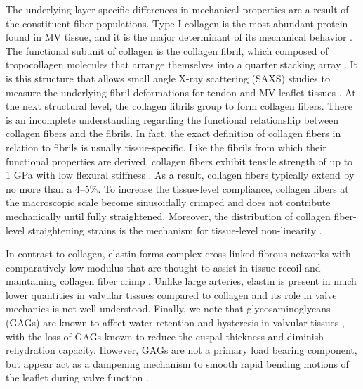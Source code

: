     
    The underlying layer-specific differences in mechanical properties are a result of the constituent fiber populations. Type I collagen is the most abundant protein found in MV tissue, and it is the major determinant of its mechanical behavior \cite{parry_molecular_1988,gelse_collagens_2003}. The functional subunit of collagen is the collagen fibril, which composed of tropocollagen molecules that arrange themselves into a quarter stacking array \cite{parry_molecular_1988,gelse_collagens_2003}. It is this structure that allows small angle X-ray scattering (SAXS) studies to measure the underlying fibril deformations for tendon \cite{sasaki_elongation_1996,sasaki_stress_1996} and MV leaflet tissues \cite{liao_relation_2007}. At the next structural level, the collagen fibrils group to form collagen fibers. There is an incomplete understanding regarding the functional relationship between collagen fibers and the fibrils. In fact, the exact definition of collagen fibers in relation to fibrils is usually tissue-specific. Like the fibrils from which their functional properties are derived, collagen fibers exhibit tensile strength of up to 1 GPa \cite{shen_stress_2008,gentleman_mechanical_2003,eppell_nano_2006,yang_mechanical_2008,sacks_biomechanics_2009} with low flexural stiffness \cite{sacks_biomechanics_2009}. As a result, collagen fibers typically extend by no more than a 4–5\%. To increase the tissue-level compliance, collagen fibers at the macroscopic scale become sinusoidally crimped \cite{parry_molecular_1988} and does not contribute mechanically until fully straightened. Moreover, the distribution of collagen fiber-level straightening strains is the mechanism for tissue-level non-linearity \cite{lanir_constitutive_1983,sacks_multiaxial_2003}. 
    
    
    In contrast to collagen, elastin forms complex cross-linked fibrous networks with comparatively low modulus that are thought to assist in tissue recoil \cite{debelle_elastin_1999,debelle_structures_1999} and maintaining collagen fiber crimp \cite{vesely_comparison_1998,scott_aortic_1995}. Unlike large arteries, elastin is present in much lower quantities in valvular tissues compared to collagen \cite{sacks_biomechanics_2009,vesely_comparison_1998,lis_biochemical_1987,stella_biaxial_2007} and its role in valve mechanics is not well understood. Finally, we note that glycosaminoglycans (GAGs) are known to affect water retention and hysteresis in valvular tissues \cite{lovekamp_stability_2006,eckert_biomechanical_2013}, with the loss of GAGs known to reduce the cuspal thickness and diminish rehydration capacity. However, GAGs are not a primary load bearing component, but appear act as a dampening mechanism to smooth rapid bending motions of the leaflet during valve function \cite{eckert_biomechanical_2013}.
    
